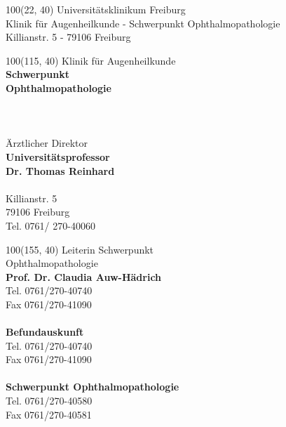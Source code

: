 \documentclass[12pt]{g-brief}
\begin{document}
\baselineskip10pt

\textblockorigin{0in}{0in}
\setlength{\TPHorizModule}{1mm}
\setlength{\TPVertModule}{1mm}

{

\begin{textblock}{100}(22, 40) 
\noindent 
\scriptsize
Universitätsklinikum Freiburg\\
\tiny
Klinik für Augenheilkunde - Schwerpunkt Ophthalmopathologie \\ Killianstr. 5 - 79106 Freiburg
\end{textblock}
}



{
\scriptsize
\begin{textblock}{100}(115, 40) 
Klinik für Augenheilkunde \\
\textbf{Schwerpunkt\\ Ophthalmopathologie}\\\\
\\\\
Ärztlicher Direktor\\
\textbf{Universitätsprofessor\\
Dr. Thomas Reinhard}\\\\
Killianstr. 5\\
79106 Freiburg\\
Tel. 0761/ 270-40060\\
\end{textblock}
}

{
\scriptsize
\begin{textblock}{100}(155, 40) 
Leiterin Schwerpunkt\\ Ophthalmopathologie\\
\textbf{Prof. Dr. Claudia Auw-Hädrich}\\
Tel. 0761/270-40740\\
Fax 0761/270-41090\\\\
\textbf{Befundauskunft}\\
Tel. 0761/270-40740\\
Fax 0761/270-41090\\\\
\textbf{Schwerpunkt Ophthalmopathologie}\\
Tel. 0761/270-40580\\
Fax 0761/270-40581
\end{textblock}
}

\begin{g-brief}
 \end{g-brief}
\end{document}
